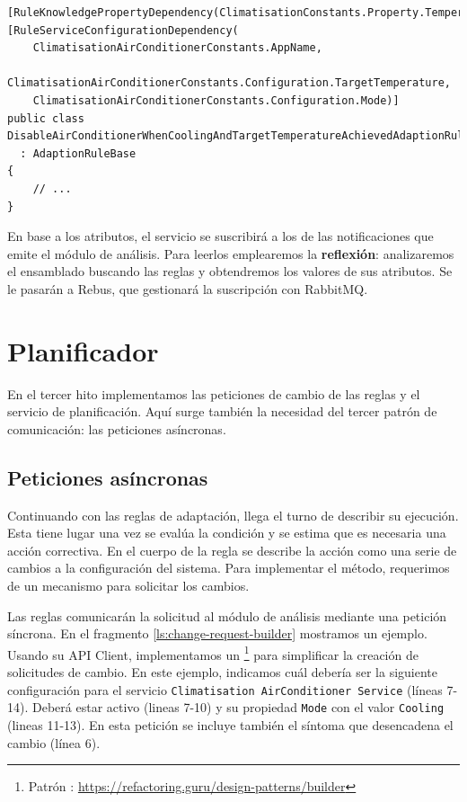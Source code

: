 \begin{lstlisting}[language={[Sharp]C},caption={Las reglas declaran sus dependencias sobre propiedades de adaptación usando atributos. Estos se utilizarán para las suscripciones a los temas de los eventos.},captionpos=b, label=ls:adaption-rule-dependencies]
[RuleKnowledgePropertyDependency(ClimatisationConstants.Property.Temperature)]
[RuleServiceConfigurationDependency(
    ClimatisationAirConditionerConstants.AppName,
    ClimatisationAirConditionerConstants.Configuration.TargetTemperature,
    ClimatisationAirConditionerConstants.Configuration.Mode)]
public class DisableAirConditionerWhenCoolingAndTargetTemperatureAchievedAdaptionRule
  : AdaptionRuleBase
{
    // ...
}
\end{lstlisting}

En base a los atributos, el servicio se suscribirá a los  de las notificaciones que emite el módulo de análisis. Para leerlos emplearemos la \textbf{reflexión}: analizaremos el ensamblado buscando las reglas y obtendremos los valores de sus atributos. Se le pasarán a Rebus, que gestionará la suscripción con RabbitMQ.

\section{Planificador}

En el tercer hito implementamos las peticiones de cambio de las reglas y el servicio de planificación. Aquí surge también la necesidad del tercer patrón de comunicación: las peticiones asíncronas.

\subsection{Peticiones asíncronas}

Continuando con las reglas de adaptación, llega el turno de describir su ejecución. Esta tiene lugar una vez se evalúa la condición y se estima que es necesaria una acción correctiva. En el cuerpo de la regla se describe la acción como una serie de cambios a la configuración del sistema. Para implementar el método, requerimos de un mecanismo para solicitar los cambios.

Las reglas comunicarán la solicitud al módulo de análisis mediante una petición síncrona. En el fragmento \ref{ls:change-request-builder} mostramos un ejemplo. Usando su API Client, implementamos un \footnote{Patrón : \url{https://refactoring.guru/design-patterns/builder}} para simplificar la creación de solicitudes de cambio. En este ejemplo, indicamos cuál debería ser la siguiente configuración para el servicio \texttt{Climatisation AirConditioner Service} (líneas 7-14). Deberá estar activo (lineas 7-10) y su propiedad \texttt{Mode} con el valor \texttt{Cooling} (lineas 11-13). En esta petición se incluye también el síntoma que desencadena el cambio (línea 6).

